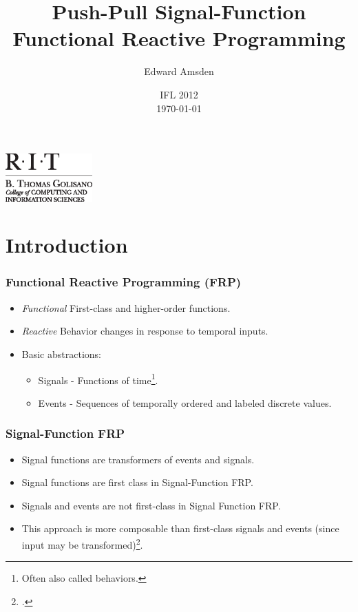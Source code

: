 \documentclass{beamer}
\title{Push-Pull Signal-Function Functional Reactive Programming}
\author{Edward Amsden}
\institute{Rochester Institute of Technology}
\date{IFL 2012\\ \today}
\begin{document}
\AtBeginSection[]
{
\begin{frame}
\end{frame}
}

\begin{frame}[plain]
\titlepage
\includegraphics[width=9em]{RIT_GCCIS1}
\end{frame}


\section{Introduction}

\begin{frame}
\frametitle{Functional Reactive Programming (FRP)}
    \begin{itemize}
        \item {\em Functional} First-class and higher-order functions.
        \item {\em Reactive} Behavior changes in response to temporal inputs.
        \item Basic abstractions:
        \begin{itemize}
            \item Signals - Functions of time\footnote{Often also called behaviors.}.
            \item Events - Sequences of temporally ordered and labeled discrete values.
        \end{itemize}
    \end{itemize}
\end{frame}

\begin{frame}
\frametitle{Signal-Function FRP}
    \begin{itemize}
        \item Signal functions are transformers of events and signals.
        \item Signal functions are first class in Signal-Function FRP.
        \item Signals and events are not first-class in Signal Function FRP.
        \item This approach is more composable than first-class signals and events (since input may be transformed)\footcite{Courtney2001-1}.
    \end{itemize}
\end{frame}
\end{document}
